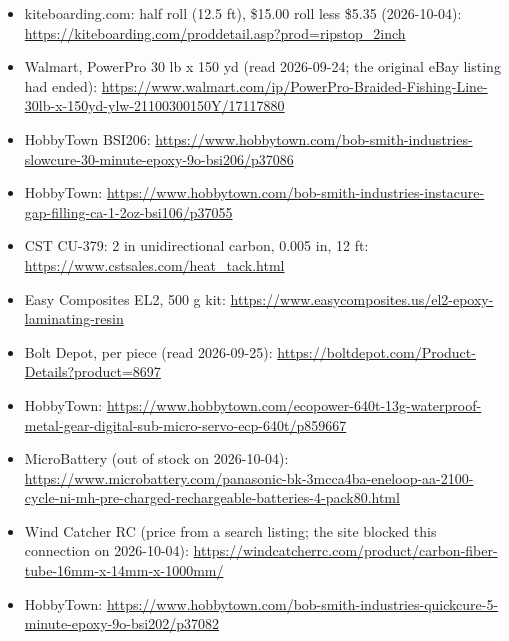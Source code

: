 \documentclass[11pt]{article}
\begin{document}
{\begin{itemize}
\item kiteboarding.com: half roll (12.5 ft), \$15.00 roll less \$5.35 (2026-10-04): \url{https://kiteboarding.com/proddetail.asp?prod=ripstop_2inch}
\item Walmart, PowerPro 30 lb x 150 yd (read 2026-09-24; the original eBay listing had ended): \url{https://www.walmart.com/ip/PowerPro-Braided-Fishing-Line-30lb-x-150yd-ylw-21100300150Y/17117880}
\item HobbyTown BSI206: \url{https://www.hobbytown.com/bob-smith-industries-slowcure-30-minute-epoxy-9o-bsi206/p37086}
\item HobbyTown: \url{https://www.hobbytown.com/bob-smith-industries-instacure-gap-filling-ca-1-2oz-bsi106/p37055}
\item CST CU-379: 2 in unidirectional carbon, 0.005 in, 12 ft: \url{https://www.cstsales.com/heat_tack.html}
\item Easy Composites EL2, 500 g kit: \url{https://www.easycomposites.us/el2-epoxy-laminating-resin}
\item Bolt Depot, per piece (read 2026-09-25): \url{https://boltdepot.com/Product-Details?product=8697}
\item HobbyTown: \url{https://www.hobbytown.com/ecopower-640t-13g-waterproof-metal-gear-digital-sub-micro-servo-ecp-640t/p859667}
\item MicroBattery (out of stock on 2026-10-04): \url{https://www.microbattery.com/panasonic-bk-3mcca4ba-eneloop-aa-2100-cycle-ni-mh-pre-charged-rechargeable-batteries-4-pack80.html}
\item Wind Catcher RC (price from a search listing; the site blocked this connection on 2026-10-04): \url{https://windcatcherrc.com/product/carbon-fiber-tube-16mm-x-14mm-x-1000mm/}
\item HobbyTown: \url{https://www.hobbytown.com/bob-smith-industries-quickcure-5-minute-epoxy-9o-bsi202/p37082}
\end{itemize}}
\end{document}
